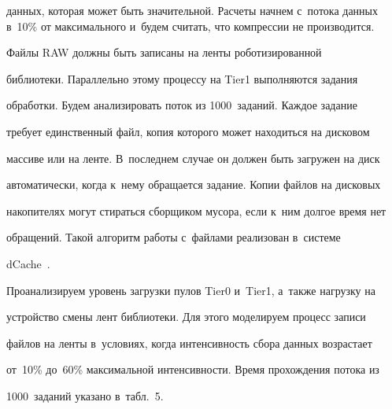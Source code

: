 данных, которая может быть значительной. Расчеты начнем с~потока данных в~10\% от максимального и~будем считать, что компрессии не производится.





  Файлы RAW должны быть записаны на ленты роботизированной


библиотеки. Параллельно этому процессу на Tier1 выполняются задания


обработки. Будем анализировать поток из 1000~заданий. Каждое задание


требует единственный файл, копия которого может находиться на дисковом


массиве или на ленте. В~последнем случае он должен быть загружен на диск


автоматически, когда к~нему обращается задание. Копии файлов на дисковых


накопителях могут стираться сборщиком мусора, если к~ним долгое время нет


обращений. Такой алгоритм работы с~файлами реализован в~системе


dCache~\cite{20-n}.





  Проанализируем уровень загрузки пулов Tier0 и~Tier1, а~также нагрузку на


устройство смены лент библиотеки. Для этого моделируем процесс записи


файлов на ленты в~условиях, когда интенсивность сбора данных возрастает


от~10\% до~60\% максимальной интенсивности. Время прохождения потока из


1000~заданий указано в~табл.~5.





